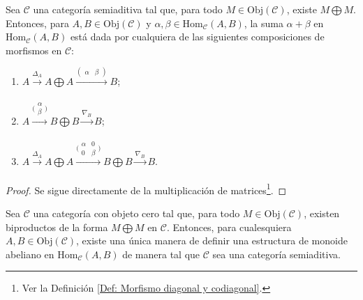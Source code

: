 \documentclass[tesis]{subfiles}
\begin{document}
\begin{Lema}\label{Mendoza-1.9.10}
    Sea $\mathscr{C}$ una categoría semiaditiva tal que, para todo $M\in\text{Obj}(\mathscr{C})$, existe $M\bigoplus M$. Entonces, para $A,B\in\text{Obj}(\mathscr{C})$ y $\alpha,\beta\in\text{Hom}_\mathscr{C}(A,B)$, la suma $\alpha+\beta$ en $\text{Hom}_\mathscr{C}(A,B)$ está dada por cualquiera de las siguientes composiciones de morfismos en $\mathscr{C}$:

    \begin{enumerate}[label=(\alph*)]
    
        \item $A\xrightarrow[]{\Delta_A} A\bigoplus A\xrightarrow[]{(\begin{smallmatrix} \alpha &\beta \end{smallmatrix})} B$;

        \item $A\xrightarrow[]{\big( \begin{smallmatrix} \alpha \\ \beta \end{smallmatrix} \big)} B\bigoplus B \xrightarrow[]{\nabla_B} B$;

        \item $A\xrightarrow[]{\Delta_A} A\bigoplus A \xrightarrow[]{\big( \begin{smallmatrix} \alpha &0 \\ 0 &\beta \end{smallmatrix} \big)} B\bigoplus B\xrightarrow[]{\nabla_B} B$.
    \end{enumerate}
\end{Lema}

\begin{proof}

    Se sigue directamente de la multiplicación de matrices\footnote{Ver la Definición \ref{Def: Morfismo diagonal y codiagonal}.}.
\end{proof}

\begin{Teo}\label{Mendoza-1.9.11}
    Sea $\mathscr{C}$ una categoría con objeto cero tal que, para todo $M\in\text{Obj}(\mathscr{C})$, existen biproductos de la forma $M\bigoplus M$ en $\mathscr{C}$. Entonces, para cualesquiera $A,B\in\text{Obj}(\mathscr{C})$, existe una única manera de definir una estructura de monoide abeliano en $\text{Hom}_\mathscr{C}(A,B)$ de manera tal que $\mathscr{C}$ sea una categoría semiaditiva.
\end{Teo}
\end{document}
